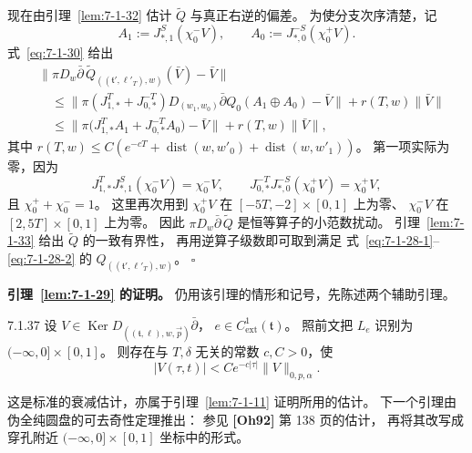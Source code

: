 现在由引理~\ref{lem:7-1-32} 估计
$\widetilde Q$ 与真正右逆的偏差。
为使分支次序清楚，记
\[
A_1:=J_{*,1}^{S}(\chi_0^-V),
\qquad A_0:=J_{*,0}^{-S}(\chi_0^+V).
\]
式~\eqref{eq:7-1-30} 给出
\[
\begin{aligned}
&\bigl\|\pi D_w\bar\partial\,
\widetilde Q_{((\mathfrak t',\ell'_T),w)}(\bar V)
-\bar V\bigr\|\\
&\quad\leq
\bigl\|\pi(J_{1,*}^{T}+J_{0,*}^{-T})
D_{(w_1,w_0)}\bar\partial Q_0(A_1\oplus A_0)
-\bar V\bigr\|
+r(T,w)\|\bar V\|\\
&\quad\leq
\bigl\|\pi\bigl(J_{1,*}^{T}A_1
+J_{0,*}^{-T}A_0\bigr)-\bar V\bigr\|
+r(T,w)\|\bar V\|,
\end{aligned}
\]
其中
$r(T,w)\leq C(e^{-cT}
+\operatorname{dist}(w,w'_0)
+\operatorname{dist}(w,w'_1))$。
第一项实际为零，因为
\[
J_{1,*}^{T}J_{*,1}^{S}(\chi_0^-V)=\chi_0^-V,
\qquad
J_{0,*}^{-T}J_{*,0}^{-S}(\chi_0^+V)=\chi_0^+V,
\]
且 $\chi_0^++\chi_0^-=1$。
这里再次用到 $\chi_0^+V$
在 $[-5T,-2]\times[0,1]$ 上为零、
$\chi_0^-V$ 在 $[2,5T]\times[0,1]$ 上为零。
因此 $\pi D_w\bar\partial\,\widetilde Q$
是恒等算子的小范数扰动。
引理~\ref{lem:7-1-33} 给出
$\widetilde Q$ 的一致有界性，
再用逆算子级数即可取到满足
式~\eqref{eq:7-1-28-1}--\eqref{eq:7-1-28-2}
的 $Q_{((\mathfrak t',\ell'_T),w)}$。
\hfill$\square$\par

\medskip\noindent\textbf{引理~\ref{lem:7-1-29} 的证明。}
仍用该引理的情形和记号，先陈述两个辅助引理。

\begin{lemma}{7.1.37}\label{lem:7-1-37}
设 $V\in\operatorname{Ker}
D_{((\mathfrak t,\ell),w,\vec p)}\bar\partial$，
$e\in C^1_{\mathrm{ext}}(\mathfrak t)$。
照前文把 $L_e$ 识别为
$(-\infty,0]\times[0,1]$。
则存在与 $T,\delta$ 无关的常数 $c,C>0$，使
\[
|V(\tau,t)|<Ce^{-c|\tau|}\|V\|_{0,p,\alpha}.
\]
\end{lemma}

这是标准的衰减估计，亦属于引理~\ref{lem:7-1-11}
证明所用的估计。
下一个引理由伪全纯圆盘的可去奇性定理推出：
参见 \textbf{[Oh92]} 第 138 页的估计，
再将其改写成穿孔附近
$(-\infty,0]\times[0,1]$ 坐标中的形式。

